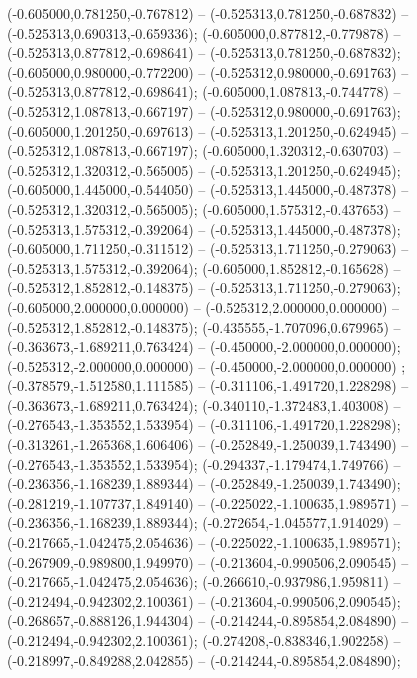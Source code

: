  (-0.605000,0.781250,-0.767812) -- (-0.525313,0.781250,-0.687832) -- (-0.525313,0.690313,-0.659336);
 (-0.605000,0.877812,-0.779878) -- (-0.525313,0.877812,-0.698641) -- (-0.525313,0.781250,-0.687832);
 (-0.605000,0.980000,-0.772200) -- (-0.525312,0.980000,-0.691763) -- (-0.525313,0.877812,-0.698641);
 (-0.605000,1.087813,-0.744778) -- (-0.525312,1.087813,-0.667197) -- (-0.525312,0.980000,-0.691763);
 (-0.605000,1.201250,-0.697613) -- (-0.525313,1.201250,-0.624945) -- (-0.525312,1.087813,-0.667197);
 (-0.605000,1.320312,-0.630703) -- (-0.525312,1.320312,-0.565005) -- (-0.525313,1.201250,-0.624945);
 (-0.605000,1.445000,-0.544050) -- (-0.525313,1.445000,-0.487378) -- (-0.525312,1.320312,-0.565005);
 (-0.605000,1.575312,-0.437653) -- (-0.525313,1.575312,-0.392064) -- (-0.525313,1.445000,-0.487378);
 (-0.605000,1.711250,-0.311512) -- (-0.525313,1.711250,-0.279063) -- (-0.525313,1.575312,-0.392064);
 (-0.605000,1.852812,-0.165628) -- (-0.525312,1.852812,-0.148375) -- (-0.525313,1.711250,-0.279063);
 (-0.605000,2.000000,0.000000) -- (-0.525312,2.000000,0.000000) -- (-0.525312,1.852812,-0.148375);
 (-0.435555,-1.707096,0.679965) -- (-0.363673,-1.689211,0.763424) -- (-0.450000,-2.000000,0.000000);
 (-0.525312,-2.000000,0.000000) -- (-0.450000,-2.000000,0.000000) ;
 (-0.378579,-1.512580,1.111585) -- (-0.311106,-1.491720,1.228298) -- (-0.363673,-1.689211,0.763424);
 (-0.340110,-1.372483,1.403008) -- (-0.276543,-1.353552,1.533954) -- (-0.311106,-1.491720,1.228298);
 (-0.313261,-1.265368,1.606406) -- (-0.252849,-1.250039,1.743490) -- (-0.276543,-1.353552,1.533954);
 (-0.294337,-1.179474,1.749766) -- (-0.236356,-1.168239,1.889344) -- (-0.252849,-1.250039,1.743490);
 (-0.281219,-1.107737,1.849140) -- (-0.225022,-1.100635,1.989571) -- (-0.236356,-1.168239,1.889344);
 (-0.272654,-1.045577,1.914029) -- (-0.217665,-1.042475,2.054636) -- (-0.225022,-1.100635,1.989571);
 (-0.267909,-0.989800,1.949970) -- (-0.213604,-0.990506,2.090545) -- (-0.217665,-1.042475,2.054636);
 (-0.266610,-0.937986,1.959811) -- (-0.212494,-0.942302,2.100361) -- (-0.213604,-0.990506,2.090545);
 (-0.268657,-0.888126,1.944304) -- (-0.214244,-0.895854,2.084890) -- (-0.212494,-0.942302,2.100361);
 (-0.274208,-0.838346,1.902258) -- (-0.218997,-0.849288,2.042855) -- (-0.214244,-0.895854,2.084890);
